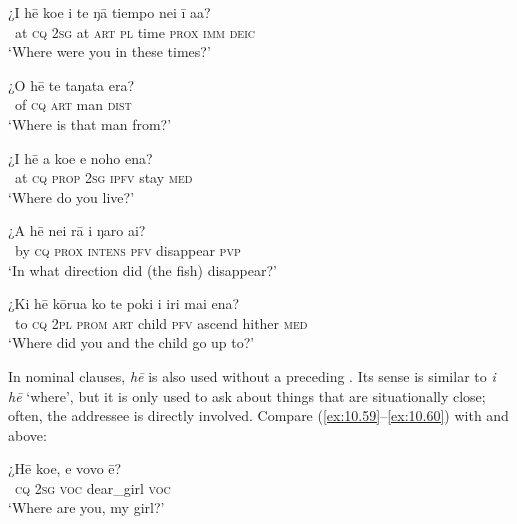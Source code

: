 \ea\label{ex:10.54}
\gll ¿{\ꞌ}I hē koe {\ꞌ}i te ŋā tiempo nei {\ꞌ}ī a{\ꞌ}a? \\
~at \textsc{cq} \textsc{2sg} at \textsc{art} \textsc{pl} time \textsc{prox} \textsc{imm} \textsc{deic} \\

\glt 
‘Where were you in these times?’ \textstyleExampleref{[R415.349]} 
\z

\ea\label{ex:10.55}
\gll ¿O hē te taŋata era? \\
~of \textsc{cq} \textsc{art} man \textsc{dist} \\

\glt 
‘Where is that man from?’ \textstyleExampleref{[Ley-3-06.003]}
\z

\ea\label{ex:10.56}
\gll ¿{\ꞌ}I hē a koe e noho ena? \\
~at \textsc{cq} \textsc{prop} \textsc{2sg} \textsc{ipfv} stay \textsc{med} \\

\glt 
‘Where do you live?’ \textstyleExampleref{[R399.052]} 
\z

\ea\label{ex:10.57}
\gll ¿A hē nei rā i ŋaro ai?\\
~by \textsc{cq} \textsc{prox} \textsc{intens} \textsc{pfv} disappear \textsc{pvp}\\

\glt 
‘In what direction did (the fish) disappear?’ \textstyleExampleref{[R301.179]} 
\z

\ea\label{ex:10.58}
\gll ¿Ki hē kōrua ko te poki i iri mai ena? \\
~to \textsc{cq} \textsc{2pl} \textsc{prom} \textsc{art} child \textsc{pfv} ascend hither \textsc{med} \\

\glt
‘Where did you and the child go up to?’ \textstyleExampleref{[R229.205]} 
\z

In nominal clauses, \textit{hē} is also used without a preceding . Its sense is similar to \textit{{\ꞌ}i hē} ‘where’, but it is only used to ask about things that are situationally close; often, the addressee is directly involved. Compare (\ref{ex:10.59}–\ref{ex:10.60}) with  and  above:

\ea\label{ex:10.59}
\gll ¿Hē koe, e vovo ē? \\
~\textsc{cq} \textsc{2sg} \textsc{voc} dear\_girl \textsc{voc} \\

\glt 
‘Where are you, my girl?’ \textstyleExampleref{[R372.030]} 
\z

